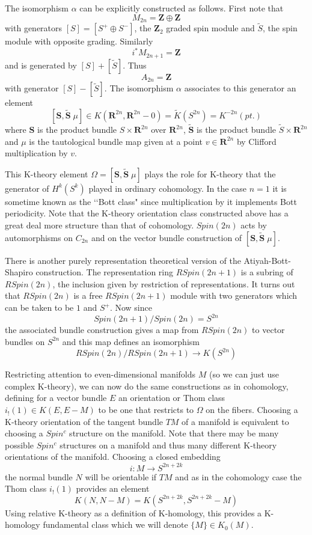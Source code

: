 \documentclass[a4paper,a4paper]{article}
\theoremstyle{conjecture}
\begin{document}
The isomorphism $\alpha$ can be explicitly constructed as follows. First note that  
$$M_{2n}=\mathbf Z \oplus \mathbf Z$$ 
with generators $[S]=[S^+\oplus S^-]$, the $\mathbf Z_2$ graded spin module and
$\widetilde S$, the spin module with opposite grading. Similarly
$$i^*M_{2n+1}=\mathbf Z$$
and is generated by $[S]+[\widetilde S]$.  Thus $$A_{2n}=\mathbf Z$$
with generator $[S]-[\widetilde S]$.  The isomorphism $\alpha$ associates
to this generator an element
$$[{\mathbf S}, {\mathbf {\widetilde S}}\; \mu]\in K(\mathbf R^{2n},\mathbf R^{2n}-0)=\widetilde K(S^{2n})=K^{-2n}(pt.)$$
where $\mathbf S$ is the product bundle $S\times \mathbf R^{2n}$ over $\mathbf R^{2n}$,
${\mathbf {\widetilde S}}$ is the product bundle $\widetilde S\times \mathbf R^{2n}$ and
$\mu$ is the tautological bundle map given at a point $v\in \mathbf R^{2n}$ by Clifford
multiplication by $v$.

This K-theory element $\Omega=[{\mathbf S}, {\mathbf {\widetilde S}}\; \mu]$ plays the
role for K-theory that the generator of $H^k(S^k)$ played in ordinary cohomology. In the
case $n=1$ it is sometime known as the \lq\lq Bott class" since multiplication by it
implements Bott periodicity.  Note that the K-theory orientation class 
constructed above has a great deal more structure than that of cohomology.  $Spin(2n)$
acts by automorphisms on $C_{2n}$ and on the vector bundle construction of
$[{\mathbf S}, {\mathbf {\widetilde S}}\; \mu]$.  

There is another purely representation theoretical
version of the Atiyah-Bott-Shapiro construction.  The representation ring
$RSpin(2n+1)$ is a subring of $RSpin(2n)$, the inclusion given by restriction
of representations.  It turns out that $RSpin(2n)$ is a free $RSpin(2n+1)$ module
with two generators which can be taken to be $1$ and $S^+$. Now since 
$$ Spin(2n+1)/Spin(2n)=S^{2n}$$
the associated bundle construction gives a map from $RSpin(2n)$ to vector bundles on $S^{2n}$
and this map defines an isomorphism
$$RSpin(2n)/RSpin(2n+1)\rightarrow K(S^{2n})$$

Restricting attention to even-dimensional manifolds $M$
(so we can just use complex K-theory), we can now do the same constructions as in cohomology, defining
for a vector bundle $E$ an orientation or Thom class $i_!(1)\in K(E,E-M)$ to be one
that restricts to $\Omega$ on the fibers.  Choosing a K-theory orientation of the tangent bundle $TM$ of a manifold
is equivalent to choosing a $Spin^c$ structure on the manifold. Note that there may be many possible $Spin^c$
structures on a manifold and thus many different K-theory orientations of the manifold.  Choosing a 
closed embedding
$$i:M\longrightarrow S^{2n+2k}$$
the normal bundle $N$ will be orientable if $TM$ and as in the cohomology case
the Thom class $i_!(1)$ provides an element
$$K(N, N-M)=K(S^{2n+2k},S^{2n+2k}-M)$$
Using relative K-theory as a definition of K-homology, this provides a K-homology fundamental class
which we will denote $\{M\}\in K_0(M)$.
\end{document}
